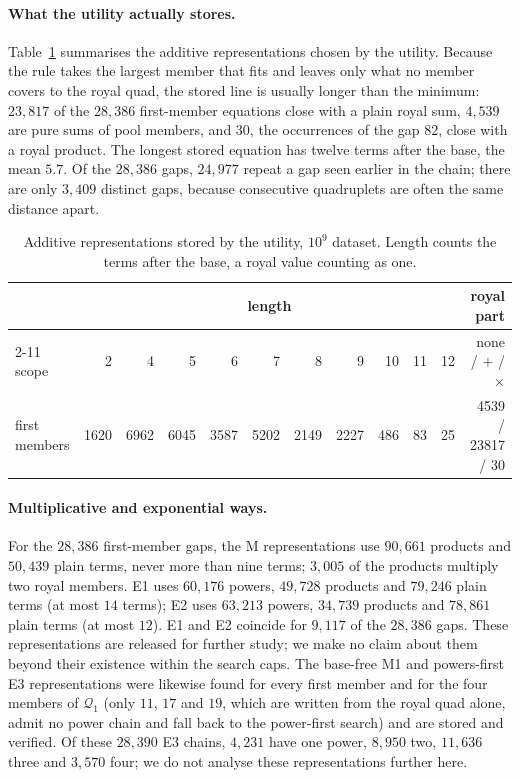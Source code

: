 \documentclass[11pt,a4paper]{article}
\newcommand{\Q}{\mathcal{Q}}
\begin{document}
\paragraph{What the utility actually stores.}
Table~\ref{tab:A} summarises the additive representations chosen by the
utility. Because the rule takes the largest member that fits and leaves
only what no member covers to the royal quad, the stored line is usually
longer than the minimum: $23{,}817$ of the $28{,}386$ first-member
equations close with a plain royal sum, $4{,}539$ are pure sums of pool
members, and $30$, the occurrences of the gap $82$, close with a royal
product. The longest stored equation has twelve terms after the base,
the mean $5.7$.
Of the $28{,}386$ gaps, $24{,}977$ repeat a gap seen earlier in the chain;
there are only $3{,}409$ distinct gaps, because consecutive quadruplets are
often the same distance apart.

\begin{table}[ht]
\centering
\caption{Additive representations stored by the utility, $10^9$ dataset.
Length counts the terms after the base, a royal value counting as one.}
\label{tab:A}
\footnotesize
\setlength{\tabcolsep}{3pt}
\begin{tabular}{lrrrrrrrrrrr}
\toprule
 & \multicolumn{10}{c}{length} & royal part \\
\cmidrule(lr){2-11}
scope & 2 & 4 & 5 & 6 & 7 & 8 & 9 & 10 & 11 & 12 & none / $+$ / $\times$ \\
\midrule
first members & 1620 & 6962 & 6045 & 3587 & 5202 & 2149 & 2227 & 486 & 83 & 25 & 4539 / 23817 / 30 \\
\bottomrule
\end{tabular}
\end{table}

\paragraph{Multiplicative and exponential ways.}
For the $28{,}386$ first-member gaps, the M representations use $90{,}661$
products and $50{,}439$ plain terms, never more than nine terms; $3{,}005$
of the products multiply two royal members. E1 uses $60{,}176$ powers,
$49{,}728$ products and $79{,}246$ plain terms (at most $14$ terms); E2
uses $63{,}213$ powers, $34{,}739$ products and $78{,}861$ plain terms (at
most $12$). E1 and E2 coincide for $9{,}117$ of the $28{,}386$ gaps. These
representations are released for further study; we make no claim about
them beyond their existence within the search caps. The base-free M1 and
powers-first E3 representations were likewise found for every first member
and for the four members of $\Q_1$ (only $11$, $17$ and $19$, which are
written from the royal quad alone, admit no power chain and fall back to
the power-first search) and are stored and verified. Of these $28{,}390$
E3 chains, $4{,}231$ have one power, $8{,}950$ two, $11{,}636$ three and
$3{,}570$ four; we do not analyse these representations further here.
\end{document}
